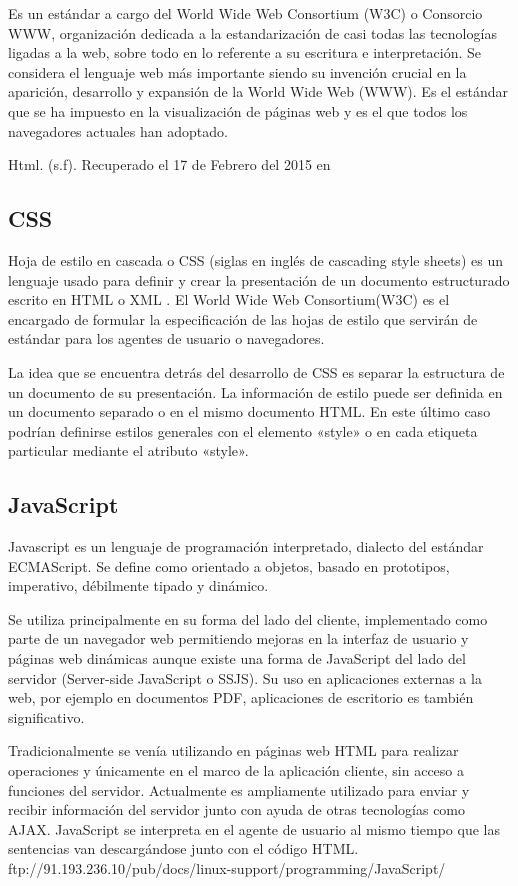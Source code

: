 Es un estándar a cargo del World Wide Web Consortium (W3C) o Consorcio WWW, organización dedicada a la estandarización de casi todas las tecnologías ligadas a la web, sobre todo en lo referente a su escritura e interpretación. Se considera el lenguaje web más importante siendo su invención crucial en la aparición, desarrollo y expansión de la World Wide Web (WWW). Es el estándar que se ha impuesto en la visualización de páginas web y es el que todos los navegadores actuales han adoptado.
\setlength{\parskip}{0mm}

Html. (s.f). Recuperado el 17 de Febrero del 2015 en

\subsection{CSS}
\setlength{\parskip}{5mm}
Hoja de estilo en cascada o CSS (siglas en inglés de cascading style sheets) es un lenguaje usado para definir y crear la presentación de un documento estructurado escrito en HTML o XML . El World Wide Web Consortium(W3C) es el encargado de formular la especificación de las hojas de estilo que servirán de estándar para los agentes de usuario o navegadores.

La idea que se encuentra detrás del desarrollo de CSS es separar la estructura de un documento de su presentación.
La información de estilo puede ser definida en un documento separado o en el mismo documento HTML. En este último caso podrían definirse estilos generales con el elemento «style» o en cada etiqueta particular mediante el atributo «style».
\setlength{\parskip}{0mm}

\subsection{JavaScript}
\setlength{\parskip}{5mm}
Javascript es un lenguaje de programación interpretado, dialecto del estándar ECMAScript. Se define como orientado a objetos, basado en prototipos, imperativo, débilmente tipado y dinámico.

Se utiliza principalmente en su forma del lado del cliente, implementado como parte de un navegador web permitiendo mejoras en la interfaz de usuario y páginas web dinámicas aunque existe una forma de JavaScript del lado del servidor (Server-side JavaScript o SSJS). Su uso en aplicaciones externas a la web, por ejemplo en documentos PDF, aplicaciones de escritorio es también significativo.

Tradicionalmente se venía utilizando en páginas web HTML para realizar operaciones y únicamente en el marco de la aplicación cliente, sin acceso a funciones del servidor. Actualmente es ampliamente utilizado para enviar y recibir información del servidor junto con ayuda de otras tecnologías como AJAX. JavaScript se interpreta en el agente de usuario al mismo tiempo que las sentencias van descargándose junto con el código HTML.
\setlength{\parskip}{0mm}
ftp://91.193.236.10/pub/docs/linux-support/programming/JavaScript/%

